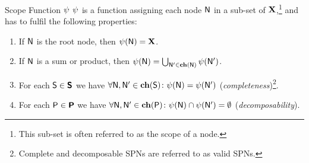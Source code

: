 \begin{frame}{Scope Function $\psi$}
$\psi$ is a function assigning each node $\mathsf{N}$ in a sub-set of $\mathbf{X}$,\footnote{\scriptsize This sub-set is often referred to as the scope of a node.} and has to fulfil the following properties:
\begin{defbox}
\begin{enumerate}
\item If $\mathsf{N}$ is the root node, then $\psi(\mathsf{N}) = \mathbf{X}$.
\item If $\mathsf{N}$ is a sum or product, then $\psi(\mathsf{N}) = \bigcup_{\mathsf{N}' \in \mathbf{ch}(\mathsf{N})} \psi(\mathsf{N}')$.
\item For each $\mathsf{S} \in \bm{\mathsf{S}}$ we have $\forall \mathsf{N}, \mathsf{N}' \in \mathbf{ch}(\mathsf{S})\colon \psi(\mathsf{N}) = \psi(\mathsf{N}')$ (\emph{completeness})\footnote{\scriptsize Complete and decomposable SPNs are referred to as valid SPNs.}.
\item For each $\mathsf{P} \in \bm{\mathsf{P}}$ we have $\forall \mathsf{N}, \mathsf{N}' \in \mathbf{ch}(\mathsf{P})\colon \psi(\mathsf{N}) \cap \psi(\mathsf{N}') = \emptyset$ (\emph{decomposability}).
\end{enumerate}
\end{defbox}
\end{frame}

